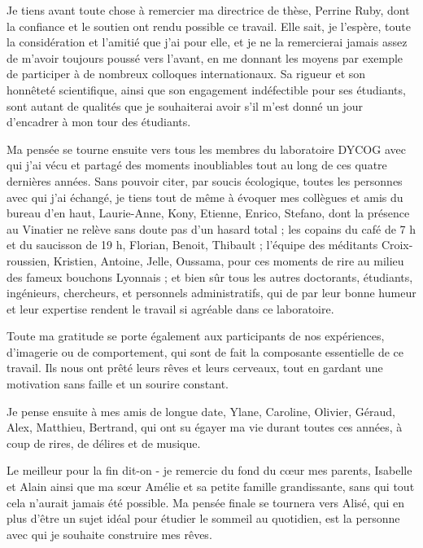 \label{sec:acknowledgement}
\vspace*{-10mm}

Je tiens avant toute chose à remercier ma directrice de thèse, Perrine Ruby, dont la confiance et le soutien ont rendu possible ce travail. Elle sait, je l'espère, toute la considération et l'amitié que j'ai pour elle, et je ne la remercierai jamais assez de m'avoir toujours poussé vers l'avant, en me donnant les moyens par exemple de participer à de nombreux colloques internationaux. Sa rigueur et son honnêteté scientifique, ainsi que son engagement indéfectible pour ses étudiants, sont autant de qualités que je souhaiterai avoir s'il m'est donné un jour d'encadrer à mon tour des étudiants.

Ma pensée se tourne ensuite vers tous les membres du laboratoire DYCOG avec qui j’ai vécu et partagé des moments inoubliables tout au long de ces quatre dernières années. Sans pouvoir citer, par soucis écologique, toutes les personnes avec qui j’ai échangé, je tiens tout de même à évoquer mes collègues et amis du bureau d’en haut, Laurie-Anne, Kony, Etienne, Enrico, Stefano, dont la présence au Vinatier ne relève sans doute pas d’un hasard total ; les copains du café de 7 h et du saucisson de 19 h, Florian, Benoit, Thibault ; l’équipe des méditants Croix-roussien, Kristien, Antoine, Jelle, Oussama, pour ces moments de rire au milieu des fameux bouchons Lyonnais ; et bien sûr tous les autres doctorants, étudiants, ingénieurs, chercheurs, et personnels administratifs, qui de par leur bonne humeur et leur expertise rendent le travail si agréable dans ce laboratoire.

Toute ma gratitude se porte également aux participants de nos expériences, d’imagerie ou de comportement, qui sont de fait la composante essentielle de ce travail. Ils nous ont prêté leurs rêves et leurs cerveaux, tout en gardant une motivation sans faille et un sourire constant.

Je pense ensuite à mes amis de longue date, Ylane, Caroline, Olivier, Géraud, Alex, Matthieu, Bertrand, qui ont su égayer ma vie durant toutes ces années, à coup de rires, de délires et de musique.

Le meilleur pour la fin dit-on - je remercie du fond du cœur mes parents, Isabelle et Alain ainsi que ma sœur Amélie et sa petite famille grandissante, sans qui tout cela n'aurait jamais été possible. Ma pensée finale se tournera vers Alisé, qui en plus d’être un sujet idéal pour étudier le sommeil au quotidien, est la personne avec qui je souhaite construire mes rêves.
